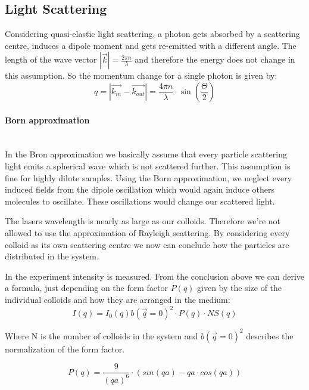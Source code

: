 \documentclass[]{article}
\begin{document}
\subsection{Light Scattering}
Considering quasi-elastic light scattering, a photon gets absorbed by a scattering centre, induces a dipole moment and gets re-emitted with a different angle. The length of the wave vector $ |\vec{k}| = \frac{2\pi n}{\lambda}$ and therefore the energy does not change in this assumption. So the momentum change for a single photon is given by:
\begin{equation}\label{eq:momentum}
q= |\vec{k_{in}} - \vec{k_{out}}| = \frac{4\pi n}{\lambda} \cdot \sin \left( \dfrac{\Theta}{2} \right)  
\end{equation}

\paragraph{Born approximation}\mbox{}\\
In the Bron approximation we basically assume that every particle scattering light emits a spherical wave which is not scattered further. This assumption is fine for highly dilute samples.
Using the Born approximation, we neglect every induced fields from the dipole oscillation which would again induce others molecules to oscillate. These oscillations would change our scattered light.

The lasers wavelength is nearly as large as our colloids. Therefore we're not allowed to use the approximation of Rayleigh scattering. By considering every colloid as its own scattering centre we now can conclude how the particles are distributed in the system.

In the experiment intensity is measured. From the conclusion above we can derive a formula, just depending on the form factor $P(q)$ given by the size of the individual colloids and how they are arranged in the medium:
\begin{equation} \label{eq:intensity}
I(q) = I_0(q)b(\vec{q}=0)^2 \cdot P(q) \cdot NS(q)
\end{equation}

Where N is the number of colloids in the system and $b(\vec{q}=0)^2$ describes the normalization of the form factor.

\begin{equation}\label{eq:form}
P(q)= \frac{9}{(qa)^6} \cdot (sin(qa) - qa \cdot cos(qa))
\end{equation}
\end{document}
